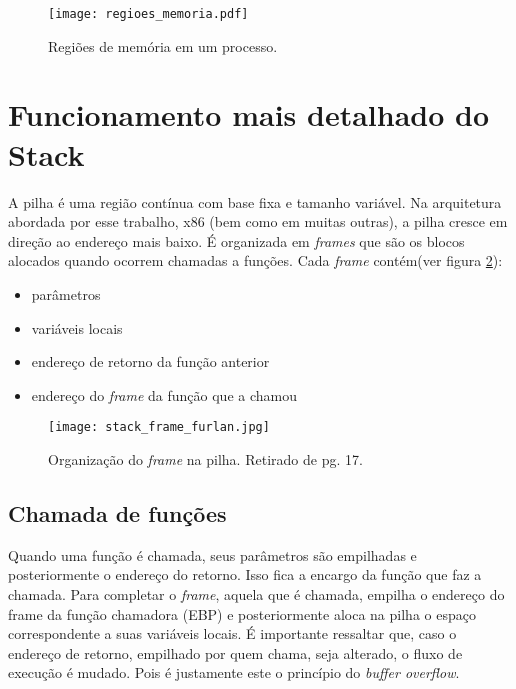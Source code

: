 	\begin{figure}
		\begin{center}
		\texttt{[image: regioes\_memoria.pdf]}
		\caption{Regiões de memória em um processo.}
		\label{fig:regioes_memoria}
		\end{center}
	\end{figure}

	\section{Funcionamento mais detalhado do Stack}
	A pilha é uma região contínua com base fixa e tamanho variável.
	Na arquitetura abordada por esse trabalho, x86 (bem como em muitas outras), a pilha cresce
	em direção ao endereço mais baixo. É organizada em \textsl{frames} que são os blocos
	alocados quando ocorrem chamadas a funções. Cada \textsl{frame} contém(ver figura \ref{fig:stack_frame}):
	\begin{itemize}
		\item parâmetros
		\item variáveis locais
		\item endereço de retorno da função anterior
		\item endereço do \textsl{frame} da função que a chamou
	\end{itemize}

	\begin{figure}
		\begin{center}
		\texttt{[image: stack\_frame\_furlan.jpg]}
		\caption{Organização do \textsl{frame} na pilha. Retirado de \cite{Furlan2005} pg. 17.}
		\label{fig:stack_frame}
		\end{center}
	\end{figure}

	\subsection{Chamada de funções}
	Quando uma função é chamada, seus parâmetros são empilhadas e posteriormente o endereço
	do retorno. Isso fica a encargo da função que faz a chamada.
	Para completar o \textsl{frame}, aquela que é chamada, empilha o endereço do frame da função chamadora
	(EBP) e posteriormente aloca na pilha o espaço correspondente a suas variáveis locais.
	É importante ressaltar que, caso o endereço de retorno, empilhado por quem chama, seja alterado,
	o fluxo de execução é mudado. Pois é justamente este o princípio do \textsl{buffer overflow}.

